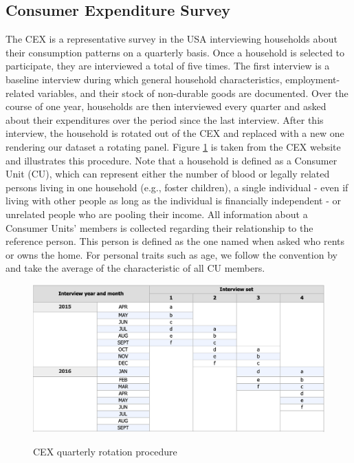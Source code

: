 \subsection{Consumer Expenditure Survey} 
The CEX is a representative survey in the USA interviewing households about their consumption patterns on a quarterly basis. Once a household is selected to participate, they are interviewed a total of five times. The first interview is a baseline interview during which general household characteristics, employment-related variables, and their stock of non-durable goods are documented. Over the course of one year, households are then interviewed every quarter and asked about their expenditures over the period since the last interview. After this interview, the household is rotated out of the CEX and replaced with a new one rendering our dataset a rotating panel. Figure \ref{fig:cex_rotation} is taken from the CEX website and illustrates this procedure. Note that a household is defined as a Consumer Unit (CU), which can represent either the number of blood or legally related persons living in one household (e.g., foster children), a single individual - even if living with other people as long as the individual is financially independent - or unrelated people who are pooling their income. All information about a Consumer Units' members is collected regarding their relationship to the reference person. This person is defined as the one named when asked who rents or owns the home. For personal traits such as age, we follow the convention by \cite{parkeretal_2013} and take the average of the characteristic of all CU members.
\begin{figure}[t]
    \caption{CEX quarterly rotation procedure}
    \centering
    \includegraphics[width=.9\linewidth]{figures/CEX_rotation_table.png}
    \label{fig:cex_rotation}
\end{figure}
